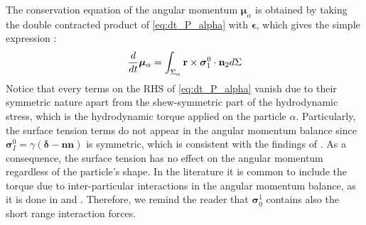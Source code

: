  

The conservation equation of the angular momentum $\bm{\mu}_\alpha$ is obtained by taking the double contracted product of \ref{eq:dt_P_alpha} with $\bm\epsilon$, which gives the simple expression :
\begin{equation}
    \frac{d}{d t}\bm{\mu}_\alpha
    =  
    \int_{\Sigma_\alpha}  \textbf{r} \times \bm{\sigma}_1^0\cdot \textbf{n}_2  d\Sigma
    \label{eq:dt_mu_alpha}
\end{equation}
Notice that every terms on the RHS of \ref{eq:dt_P_alpha} vanish due to their symmetric nature apart from the shew-symmetric part of the hydrodynamic stress, which is the hydrodynamic torque applied on the particle $\alpha$.
Particularly, the surface tension terms do not appear in the angular momentum balance since $\bm\sigma_I^0 = \gamma (\bm\delta-\textbf{nn})$ is symmetric, which is consistent with the findings of \citet{hesla1993note}. 
As a consequence, the surface tension has no effect on the angular momentum regardless of the particle's shape. 
In the literature it is common to include the torque due to inter-particular interactions in the angular momentum balance, as it is done in \citet{jackson1997locally} and \citet{zhang1997momentum}.
Therefore, we remind the reader that $\bm{\sigma}_0^1$ contains also the short range interaction forces.


